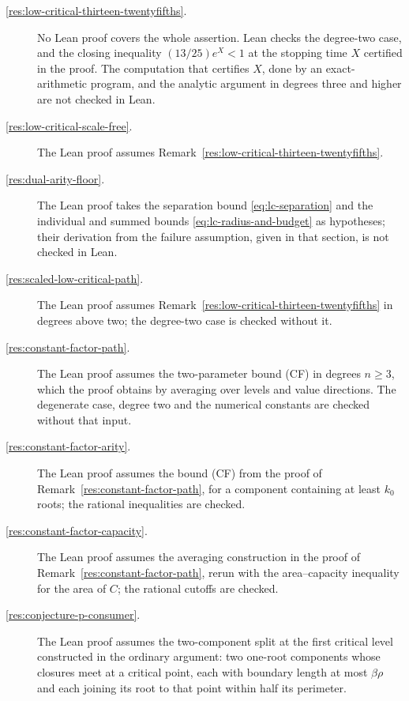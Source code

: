 \begin{description}
\item[\ref{res:low-critical-thirteen-twentyfifths}.] No Lean proof covers the whole assertion. Lean checks the
degree-two case, and the closing inequality $(13/25)e^X<1$ at the stopping
time $X$ certified in the proof. The computation that certifies $X$, done by an
exact-arithmetic program, and the analytic argument in degrees three and
higher are not checked in Lean.

\item[\ref{res:low-critical-scale-free}.] The Lean proof assumes
Remark~\ref{res:low-critical-thirteen-twentyfifths}.

\item[\ref{res:dual-arity-floor}.] The Lean proof takes the separation bound
\eqref{eq:lc-separation} and the individual and summed bounds
\eqref{eq:lc-radius-and-budget} as hypotheses; their derivation from the
failure assumption, given in that section, is not checked in Lean.

\item[\ref{res:scaled-low-critical-path}.] The Lean proof assumes
Remark~\ref{res:low-critical-thirteen-twentyfifths} in degrees above two;
the degree-two case is checked without it.

\item[\ref{res:constant-factor-path}.] The Lean proof assumes the two-parameter bound (CF)
in degrees $n\ge3$, which the proof obtains by averaging over levels and
value directions. The degenerate case, degree two and the numerical
constants are checked without that input.

\item[\ref{res:constant-factor-arity}.] The Lean proof assumes the bound (CF) from the proof of
Remark~\ref{res:constant-factor-path}, for a component containing at least
$k_0$ roots; the rational inequalities are checked.

\item[\ref{res:constant-factor-capacity}.] The Lean proof assumes the averaging construction in the
proof of Remark~\ref{res:constant-factor-path}, rerun with the
area--capacity inequality for the area of $C$; the rational cutoffs are
checked.

\item[\ref{res:conjecture-p-consumer}.] The Lean proof assumes the two-component split at the
first critical level constructed in the ordinary argument: two one-root
components whose closures meet at a critical point, each with boundary
length at most $\beta\rho$ and each joining its root to that point within
half its perimeter.


\end{description}
